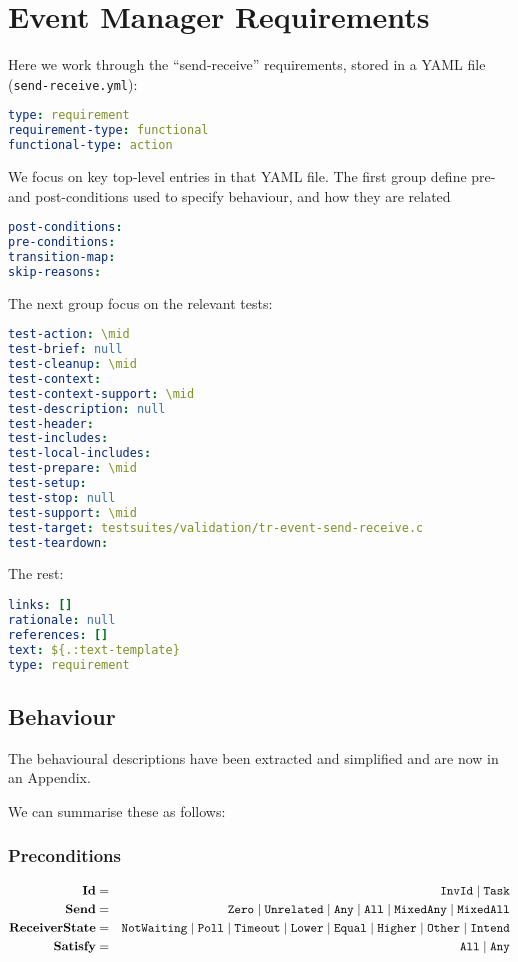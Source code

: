 \chapter{Event Manager Requirements}


Here we work through the ``send-receive'' requirements,
stored in a YAML file (\texttt{send-receive.yml}):
\begin{lstlisting}[language=yaml]
type: requirement
requirement-type: functional
functional-type: action
\end{lstlisting}

We focus on key top-level entries in that YAML file.
The first group define pre- and post-conditions
used to specify behaviour,
and how they are related
\begin{lstlisting}[language=yaml]
post-conditions:
pre-conditions:
transition-map:
skip-reasons:
\end{lstlisting}

The next group focus on the relevant tests:
\begin{lstlisting}[language=yaml]
test-action: \mid
test-brief: null
test-cleanup: \mid
test-context:
test-context-support: \mid
test-description: null
test-header:
test-includes:
test-local-includes:
test-prepare: \mid
test-setup:
test-stop: null
test-support: \mid
test-target: testsuites/validation/tr-event-send-receive.c
test-teardown:
\end{lstlisting}


The rest:
\begin{lstlisting}[language=yaml]
links: []
rationale: null
references: []
text: ${.:text-template}
type: requirement
\end{lstlisting}

\section{Behaviour}

The behavioural descriptions have been extracted and simplified
and are now in an Appendix.

We can summarise these as follows:

\subsection{Preconditions}

\begin{eqnarray*}
   \mathbf{Id} &=& \mathtt{InvId} \mid \mathtt{Task}
\\ \mathbf{Send} &=& \mathtt{Zero} \mid \mathtt{Unrelated} \mid \mathtt{Any} \mid \mathtt{All} \mid \mathtt{MixedAny} \mid \mathtt{MixedAll}
\\ \mathbf{ReceiverState} &=& \mathtt{NotWaiting} \mid \mathtt{Poll} \mid \mathtt{Timeout}
   \mid \mathtt{Lower} \mid \mathtt{Equal} \mid \mathtt{Higher} \mid \mathtt{Other} \mid \mathtt{Intend}
\\ \mathbf{Satisfy} &=& \mathtt{All} \mid \mathtt{Any}
\end{eqnarray*}

